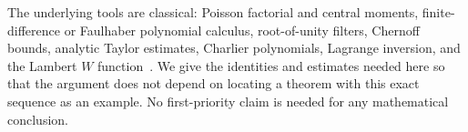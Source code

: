 The underlying tools are classical: Poisson factorial and central moments,
finite-difference or Faulhaber polynomial calculus, root-of-unity filters,
Chernoff bounds, analytic Taylor estimates, Charlier polynomials,
Lagrange inversion, and the Lambert $W$ function~\cite{dlmf,corless}.
We give the identities and estimates needed here so that the argument does
not depend on locating a theorem with this exact sequence as an example.
No first-priority claim is needed for any mathematical conclusion.
